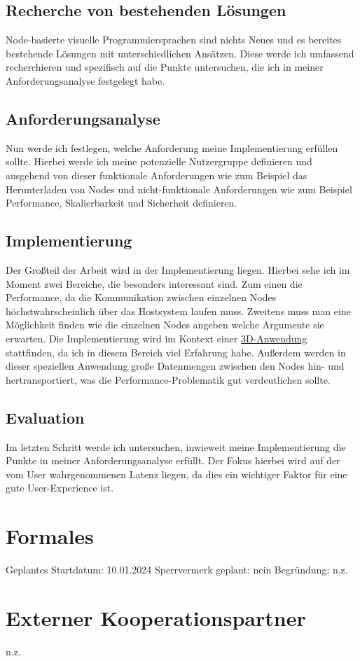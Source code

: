 \documentclass[ngerman]{article}
\begin{document}
\subsection{Recherche von bestehenden Lösungen}
Node-basierte visuelle Programmiersprachen sind nichts Neues und es bereites bestehende Lösungen mit unterschiedlichen Ansätzen. Diese werde ich umfassend recherchieren und spezifisch auf die Punkte untersuchen, die ich in meiner Anforderungsanalyse festgelegt habe.

\subsection{Anforderungsanalyse}
Nun werde ich festlegen, welche Anforderung meine Implementierung erfüllen sollte. Hierbei werde ich meine potenzielle Nutzergruppe definieren und ausgehend von dieser funktionale Anforderungen wie zum Beispiel das Herunterladen von Nodes und nicht-funktionale Anforderungen wie zum Beispiel Performance, Skalierbarkeit und Sicherheit definieren.

\subsection{Implementierung}
Der Großteil der Arbeit wird in der Implementierung liegen. Hierbei sehe ich im Moment zwei Bereiche, die besonders interessant sind. Zum einen die Performance, da die Kommunikation zwischen einzelnen Nodes höchstwahrscheinlich über das Hostsystem laufen muss. Zweitens muss man eine Möglichkeit finden wie die einzelnen Nodes angeben welche Argumente sie erwarten. 
\linebreak
\linebreak
Die Implementierung wird im Kontext einer \href{https://plant.max-richter.dev}{3D-Anwendung} stattfinden, da ich in diesem Bereich viel Erfahrung habe. Außerdem werden in dieser speziellen Anwendung große Datenmengen zwischen den Nodes hin- und hertransportiert, was die Performance-Problematik gut verdeutlichen sollte.

\subsection{Evaluation}
Im letzten Schritt werde ich untersuchen, inwieweit meine Implementierung die Punkte in meiner Anforderungsanalyse erfüllt. Der Fokus hierbei wird auf der vom User wahrgenommenen Latenz liegen, da dies ein wichtiger Faktor für eine gute User-Experience ist. \cite{6876022}

\section{Formales}
Geplantes Startdatum: 10.01.2024
\linebreak
Sperrvermerk geplant: nein
\linebreak
Begründung: n.z.

\section{Externer Kooperationspartner}
n.z.

\pagebreak

\printbibliography
\end{document}
